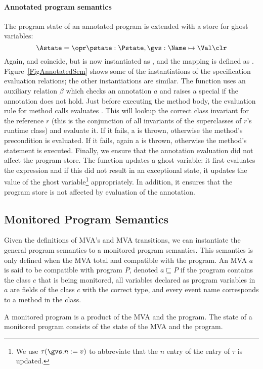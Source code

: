 \paragraph{Annotated program semantics}


The program state of an annotated program is extended with a store for
ghost variables:
\[
\Astate = \opr \pstate : \Pstate, \gvs : \Name \mapsto \Val \clr
\]
Again, \FullProgram and \Program coincide, but \FullState is now
instantiated as \Astate, and the mapping \progstate is defined as
\pstate. Figure~\ref{FigAnnotatedSem} shows some of the 
instantiations of the specification evaluation relations; the other
instantiations are similar. The function \gammain uses an auxiliary
relation \(\beta\) which checks an annotation \(a\) and raises
a special \JMLExc if the annotation does not hold. Just before
executing the method body, the evaluation rule for method calls
evaluates \gammain. This will lookup the correct class invariant for
the reference \(r\) (this is the conjunction of all invariants of the
superclasses of \(r\)'s runtime class) and evaluate it. If it fails, a
\JMLExc is thrown, otherwise the method's precondition is
evaluated. If it fails, again a \JMLExc is thrown, otherwise the
method's \preset statement is executed. Finally, we ensure that the
annotation evaluation did not affect the program store. The function
\deltaset updates a ghost variable: it first evaluates the expression
and if this did not result in an exceptional state, it updates the
value of the ghost variable\footnote{We use \(\tau(\gvs.n := v)\) to
abbreviate that the \(n\) entry of the \gvs entry of \(\tau\) is
updated.} appropriately. In addition, it ensures that the program
store is not affected by evaluation of the annotation.

\subsection{Monitored Program Semantics}
Given the definitions of MVA's and MVA transitions, we can instantiate
the general program semantics to a monitored program semantics. This
semantics is only defined when the MVA total and compatible with the
program. An MVA \(a\) is said to be compatible with program \(P\),
denoted \(a \sqsubseteq P\) if the program contains the class \(c\) that is
being monitored, all variables declared as program variables in
\(a\) are fields of the class \(c\) with the correct type, and every
event name corresponds to a method in the class. 

A monitored program is a product of the MVA and the program.
The state of a monitored program consists of the state of the MVA and
the program.

